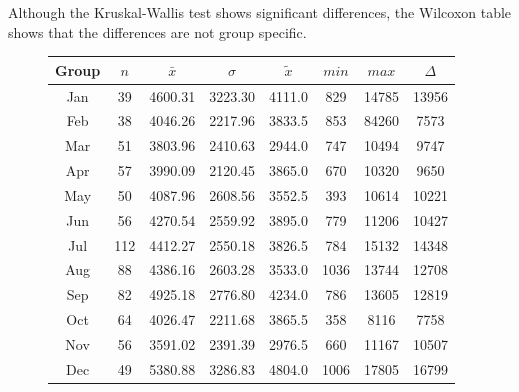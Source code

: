 Although the Kruskal-Wallis test shows significant differences, the Wilcoxon table shows that the differences are not group specific.
\begin{figure}[ht!]
	\centering
	\begin{minipage}{0.5\textwidth}
		\tiny
		\setlength{\tabcolsep}{4pt}
		\centering
		\begin{tabular}{c|c|c|c|c|c|c|c}
			\toprule
			Group & $n$ & $\bar{x}$ & $\sigma$ & $\tilde{x}$ & $min$ & $max$ & $\Delta$ \\
			\midrule
			Jan & 39  & 4600.31 & 3223.30 & 4111.0 & 829  & 14785 & 13956 \\ 
			Feb & 38  & 4046.26 & 2217.96 & 3833.5 & 853  & 84260 & 7573  \\ 
			Mar & 51  & 3803.96 & 2410.63 & 2944.0 & 747  & 10494 & 9747  \\ 
			Apr & 57  & 3990.09 & 2120.45 & 3865.0 & 670  & 10320 & 9650  \\ 
			May & 50  & 4087.96 & 2608.56 & 3552.5 & 393  & 10614 & 10221 \\ 
			Jun & 56  & 4270.54 & 2559.92 & 3895.0 & 779  & 11206 & 10427 \\ 
			Jul & 112 & 4412.27 & 2550.18 & 3826.5 & 784  & 15132 & 14348 \\ 
			Aug & 88  & 4386.16 & 2603.28 & 3533.0 & 1036 & 13744 & 12708 \\ 
			Sep & 82  & 4925.18 & 2776.80 & 4234.0 & 786  & 13605 & 12819 \\ 
			Oct & 64  & 4026.47 & 2211.68 & 3865.5 & 358  & 8116  & 7758  \\ 
			Nov & 56  & 3591.02 & 2391.39 & 2976.5 & 660  & 11167 & 10507 \\ 
			Dec & 49  & 5380.88 & 3286.83 & 4804.0 & 1006 & 17805 & 16799 \\ 
			\bottomrule
		\end{tabular}
		\label{tbl:descriptives_baysis_effector_Month_SAvg}
	\end{minipage}%
	\begin{minipage}{0.55\textwidth}
\end{minipage}
\end{figure}

